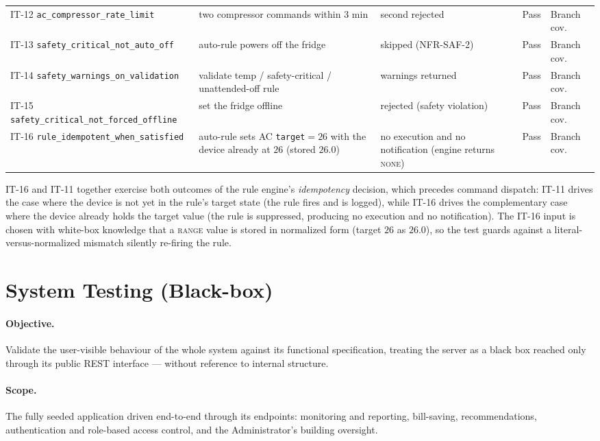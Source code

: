 \begin{table}[htbp]
{\begin{tabularx}{\textwidth}{@{}L{0.225\textwidth} X X c L{0.085\textwidth}@{}}
IT-12 \texttt{ac\_compressor\_rate\_limit} & two compressor commands within 3 min & second rejected & Pass & Branch cov. \\
IT-13 \texttt{safety\_critical\_not\_auto\_off} & auto-rule powers off the fridge & skipped (NFR-SAF-2) & Pass & Branch cov. \\
IT-14 \texttt{safety\_warnings\_on\_validation} & validate temp / safety-critical / unattended-off rule & warnings returned & Pass & Branch cov. \\
IT-15 \texttt{safety\_critical\_not\_forced\_offline} & set the fridge offline & rejected (safety violation) & Pass & Branch cov. \\
IT-16 \texttt{rule\_idempotent\_when\_satisfied} & auto-rule sets AC \texttt{target}$=26$ with the device already at $26$ (stored $26.0$) & no execution and no notification (engine returns \textsc{none}) & Pass & Branch cov. \\
\bottomrule
\end{tabularx}}
\end{table}

IT-16 and IT-11 together exercise both outcomes of the rule engine's
\emph{idempotency} decision, which precedes command dispatch: IT-11 drives the case
where the device is not yet in the rule's target state (the rule fires and is logged),
while IT-16 drives the complementary case where the device already holds the target
value (the rule is suppressed, producing no execution and no notification). The IT-16
input is chosen with white-box knowledge that a \textsc{range} value is stored in
normalized form (target $26$ as $26.0$), so the test guards against a
literal-versus-normalized mismatch silently re-firing the rule.

\section{System Testing (Black-box)}
\label{sec:qa-system}

\paragraph{Objective.} Validate the user-visible behaviour of the whole system
against its functional specification, treating the server as a black box reached
only through its public REST interface --- without reference to internal structure.

\paragraph{Scope.} The fully seeded application driven end-to-end through its
endpoints: monitoring and reporting, bill-saving, recommendations, authentication
and role-based access control, and the Administrator's building oversight.

